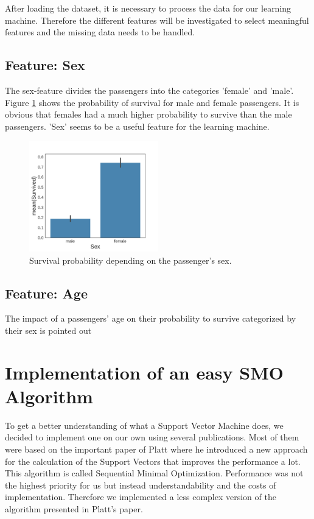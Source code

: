 After loading the dataset, it is necessary to process the data for our learning machine. Therefore the different features will be investigated to select meaningful features and the missing data needs to be handled.

\subsection{Feature: Sex}
The sex-feature divides the passengers into the categories 'female' and 'male'. Figure \ref{fig:sexfeat} shows the probability of survival for male and female passengers. It is obvious that females had a much higher probability to survive than the male passengers. 'Sex' seems to be a useful feature for the learning machine.
 \begin{figure}
 	\centering
    \includegraphics[width=0.5\textwidth]{media_saved/sex_survived}
  \caption{Survival probability depending on the passenger's sex.}
  \label{fig:sexfeat}
 \end{figure}

\subsection{Feature: Age}
The impact of a passengers' age on their probability to survive categorized by their sex is pointed out 

\section{Implementation of an easy SMO Algorithm}
To get a better understanding of what a Support Vector Machine does, we decided to implement one on our own using several publications. Most of them were based on the important paper of Platt \cite{platt} where he introduced a new approach for the calculation of the Support Vectors that improves the performance a lot. This algorithm is called Sequential Minimal Optimization. Performance was not the highest priority for us but instead understandability and the costs of implementation. Therefore we implemented a less complex version of the algorithm presented in Platt's paper.


